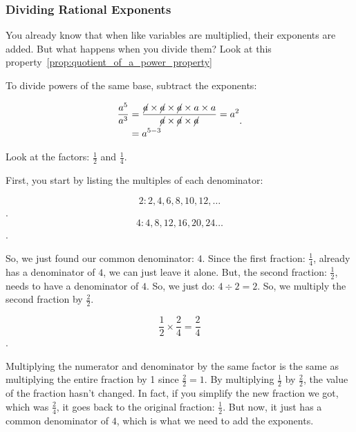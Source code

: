 
\subsubsection{Dividing Rational Exponents}
\label{sub_sub_sec:dividing_rational_exponents}

You already know that when like variables are multiplied, their exponents are
added. But what happens when you divide them? Look at this
property~\ref{prop:quotient_of_a_power_property}

\begin{property}
  \label{prop:quotient_of_a_power_property}

  To divide powers of the same base, subtract the exponents:
\end{property}

\begin{example}
  \label{exm:quotient_of_a_power_property}

  \begin{equation}
    \label{eqt:quotient_of_a_power_property}
    \begin{split}
      \frac{a^{5}}{a^{3}} &= \frac{\cancel{a} \times \cancel{a} \times
                       \cancel{a} \times a \times a}{\cancel{a} \times \cancel{a} \times
                       \cancel{a}}
                    = a^{2} \\
                    &= a^{5 - 3}
    \end{split}
  .\end{equation}
\end{example}

\begin{review}
  \label{rev:finding_a_common_denominator}

  Look at the factors: $\frac{1}{2}$ and $\frac{1}{4}$.

  First, you start by listing the multiples of each denominator:

  \[ 2: 2, \boxed{4}, 6, 8, 10, 12, \ldots \].
  \[ 4: \boxed{4}, 8, 12, 16, 20, 24 \ldots \].

  So, we just found our common denominator: $4$. Since the first fraction:
  $\frac{1}{4}$, already has a denominator of $4$, we can just leave it alone.
  But, the second fraction: $\frac{1}{2}$, needs to have a denominator of $4$.
  So, we just do: $4 \div 2 = 2$. So, we multiply the second fraction by
  $\frac{2}{2}$.

  \[ \frac{1}{2} \times \frac{2}{4} = \frac{2}{4} \].

  Multiplying the numerator and denominator by the same factor is the same as
  multiplying the entire fraction by 1 since $\frac{2}{2} = 1$. By multiplying 
  $\frac{1}{2}$ by $\frac{2}{2}$, the value of the fraction hasn't changed. In
  fact, if you simplify the new fraction we got, which was $\frac{2}{4}$, it
  goes back to the original fraction: $\frac{1}{2}$. But now, it just has a
  common denominator of $4$, which is what we need to add the exponents.
\end{review}

